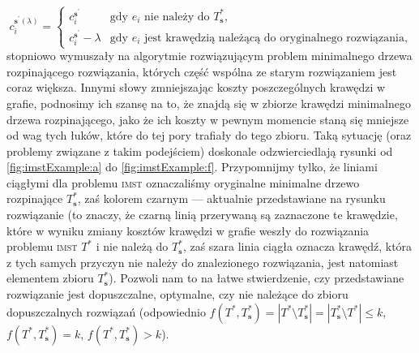 \begin{equation}
c^{\textbf{s}^{\prime} \left( \lambda \right)}_{i} = \left\{\begin{matrix}
c^{\textbf{s}^{\prime}}_{i} & \text{gdy $e_{i}$ nie należy do $T^{\ast}_{\textbf{s}}$,}\\ 
c^{\textbf{s}^{\prime}}_{i} - \lambda &  \text{gdy $e_{i}$ jest krawędzią należącą do oryginalnego rozwiązania,}
\end{matrix}\right.
\end{equation}
stopniowo wymuszały na algorytmie rozwiązującym problem minimalnego drzewa rozpinającego rozwiązania, których część wspólna ze starym rozwiązaniem jest coraz większa. Innymi słowy zmniejszając koszty poszczególnych krawędzi w grafie, podnosimy ich szansę na to, że znajdą się w zbiorze krawędzi minimalnego drzewa rozpinającego, jako że ich koszty w pewnym momencie staną się mniejsze od wag tych łuków, które do tej pory trafiały do tego zbioru. Taką sytuację (oraz problemy związane z takim podejściem) doskonale odzwierciedlają rysunki od \ref{fig:imstExample:a} do \ref{fig:imstExample:f}. Przypomnijmy tylko, że liniami ciągłymi dla problemu \textsc{imst} oznaczaliśmy oryginalne minimalne drzewo rozpinające $T^{\ast}_{\textbf{s}}$, zaś kolorem czarnym --- aktualnie przedstawiane na rysunku rozwiązanie (to znaczy, że czarną linią przerywaną są zaznaczone te krawędzie, które w wyniku zmiany kosztów krawędzi w grafie weszły do rozwiązania problemu \textsc{imst} $T^{\ast}$ i nie należą do $T^{\ast}_{\textbf{s}}$, zaś szara linia ciągła oznacza krawędź, która z tych samych przyczyn nie należy do znalezionego rozwiązania, jest natomiast elementem zbioru $T^{\ast}_{\textbf{s}}$). Pozwoli nam to na łatwe stwierdzenie, czy przedstawiane rozwiązanie jest dopuszczalne, optymalne, czy nie należące do zbioru dopuszczalnych rozwiązań (odpowiednio $f \left( T^{\ast}, T^{\ast}_{\textbf{s}} \right) = \left| T^{\ast} \setminus T^{\ast}_{\textbf{s}} \right| = \left| T^{\ast}_{\textbf{s}} \setminus T^{\ast} \right| \leqslant k$, $f \left( T^{\ast}, T^{\ast}_{\textbf{s}} \right) = k$, $f \left( T^{\ast}, T^{\ast}_{\textbf{s}} \right) > k$).

